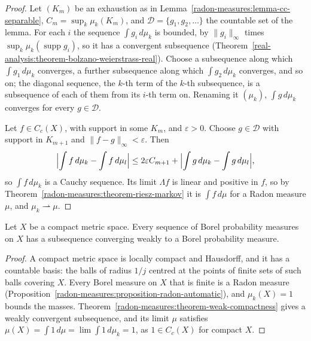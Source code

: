 \begin{proof}
Let $(K_m)$ be an exhaustion as in Lemma~\ref{radon-measures:lemma-cc-separable}, $C_m = \sup_k\mu_k(K_m)$, and $\mathcal{D} = \{g_1, g_2, \ldots\}$ the countable set of the lemma. For each $i$ the
sequence $\int g_i\,d\mu_k$ is bounded, by $\|g_i\|_\infty$ times $\sup_k\mu_k(\operatorname{supp}g_i)$, so it has a convergent subsequence (Theorem~\ref{real-analysis:theorem-bolzano-weierstrass-real}).
Choose a subsequence along which $\int g_1\,d\mu_k$ converges, a further subsequence along which $\int g_2\,d\mu_k$ converges, and so on; the diagonal sequence, the $k$-th term of the $k$-th
subsequence, is a subsequence of each of them from its $i$-th term on. Renaming it $(\mu_k)$, $\int g\,d\mu_k$ converges for every $g \in \mathcal{D}$.

Let $f \in C_c(X)$, with support in some $K_m$, and $\varepsilon > 0$. Choose $g \in \mathcal{D}$ with support in $K_{m+1}$ and $\|f - g\|_\infty < \varepsilon$. Then
\[
\Bigl|\int f\,d\mu_k - \int f\,d\mu_l\Bigr| \leq 2\varepsilon C_{m+1} + \Bigl|\int g\,d\mu_k - \int g\,d\mu_l\Bigr|,
\]
so $\int f\,d\mu_k$ is a Cauchy sequence. Its limit $\Lambda f$ is linear and positive in $f$, so by Theorem~\ref{radon-measures:theorem-riesz-markov} it is $\int f\,d\mu$ for a Radon measure $\mu$, and
$\mu_k \rightharpoonup \mu$.
\end{proof}

\begin{corollary}\label{radon-measures:corollary-probability-compact}
Let $X$ be a compact metric space. Every sequence of Borel probability measures on $X$ has a subsequence converging weakly to a Borel probability measure.
\end{corollary}

\begin{proof}
A compact metric space is locally compact and Hausdorff, and it has a countable basis: the balls of radius $1/j$ centred at the points of finite sets of such balls covering $X$. Every Borel measure on
$X$ that is finite is a Radon measure (Proposition~\ref{radon-measures:proposition-radon-automatic}), and $\mu_k(X) = 1$ bounds the masses. Theorem~\ref{radon-measures:theorem-weak-compactness} gives a
weakly convergent subsequence, and its limit $\mu$ satisfies $\mu(X) = \int 1\,d\mu = \lim\int 1\,d\mu_k = 1$, as $1 \in C_c(X)$ for compact $X$.
\end{proof}

